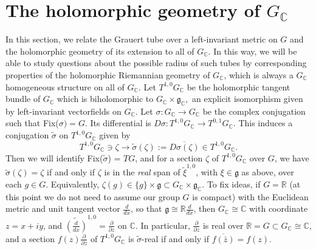 \documentclass[12pt,reqno]{amsart}\usepackage{amssymb,amsmath,amscd,epsfig,amsthm,enumerate,import,eufrak}
\theoremstyle{definition}
\theoremstyle{remark}
\numberwithin{equation}{section}
\theoremstyle{plain}
\theoremstyle{definition}
\def \r {\mathbb{R}}
\def \c {\mathbb{C}}
\def \mfg {\mathfrak{g}}
\def \vs {\vskip 2mm}
\theoremstyle{remark}
\numberwithin{theorem}{section}
\begin{document}
\section{The holomorphic geometry of $G_{\c}$} \label{sec:Gcgeom}
\vs\vs
In this section, we relate the Grauert tube over a left-invariant metric on $G$ and the holomorphic geometry of its extension to all of $G_{\c}$. In this way, we will be able to study questions about the possible radius of such tubes by corresponding properties of the holomorphic Riemannian geometry of $G_{\c}$, which is always a $G_{\c}$ homogeneous structure on all of $G_{\c}$.
\vs\vs
Let $T^{1,0}G_{\c}$ be the holomorphic tangent bundle of $G_{\c}$ which is biholomorphic to $G_{\c} \times \mathfrak{g}_{\c},$ an explicit isomorphism given by left-invariant vectorfields on $G_{\c}$. Let $\sigma: G_{\c} \to G_{\c}$ be the complex conjugation such that Fix($\sigma) = G$. Its differential is $D\sigma: T^{1,0}G_{\c} \to T^{0,1}G_{\c}$. This induces a conjugation $\tilde{\sigma}$ on $T^{1,0}G_{\c}$ given by
%
\begin{equation} \label{eqn:conjdef}
	T^{1,0}G_{\c} \ni \zeta \to \tilde{\sigma}(\zeta) := \overline{D\sigma(\zeta)} \in T^{1,0}G_{\c}.
\end{equation}
%
Then we will identify Fix($\tilde{\sigma}$) = $TG$, and for a section $\zeta$ of $T^{1,0}G_{\c}$ over $G$, we have $\tilde{\sigma}(\zeta) = \zeta$ if and only if $\zeta$ is in the \emph{real} span of $\tilde{\xi}^{1,0}$, with $\xi \in \mfg$ as above, over each $g \in G$. Equivalently, $\zeta(g) \in \{g\} \times \mathfrak{g} \subset G_{\c} \times \mathfrak{g}_{\c}.$ To fix ideas, if $G = \r$ (at this point we do not need to assume our group $G$ is compact) with the Euclidean metric and unit tangent vector $\frac{d}{dx}$, so that $\mfg \cong \r \frac{d}{dx} $, then $G_{\c}\cong \c$ with coordinate $z = x+iy$, and $\widetilde{(\frac{d}{dx})}^{1,0} = \frac{\partial}{\partial z}$ on $\c$. In particular, $\frac{\partial}{\partial z}$ is real over $\r = G \subset G_{\c} \cong \c$, and a section $f(z) \frac{\partial}{\partial z}$ of $T^{1,0}G_{\c}$ is $\tilde{\sigma}$-real if and only if $\overline{f(\bar{z})} = f(z)$. 
%
\vs
%
\end{document}
